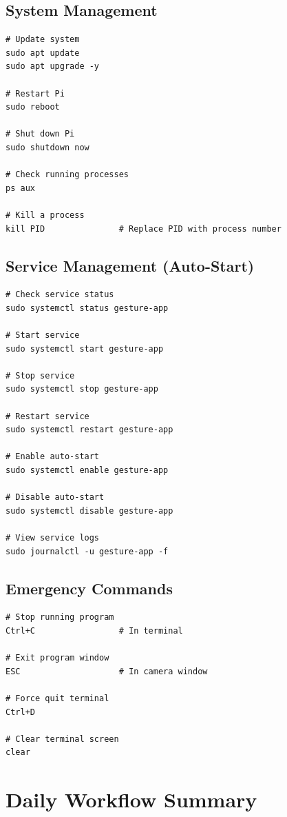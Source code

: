 \documentclass[12pt,a4paper]{article}
\begin{document}
\subsection{System Management}

\begin{lstlisting}
# Update system
sudo apt update
sudo apt upgrade -y

# Restart Pi
sudo reboot

# Shut down Pi
sudo shutdown now

# Check running processes
ps aux

# Kill a process
kill PID               # Replace PID with process number
\end{lstlisting}

\subsection{Service Management (Auto-Start)}

\begin{lstlisting}
# Check service status
sudo systemctl status gesture-app

# Start service
sudo systemctl start gesture-app

# Stop service
sudo systemctl stop gesture-app

# Restart service
sudo systemctl restart gesture-app

# Enable auto-start
sudo systemctl enable gesture-app

# Disable auto-start
sudo systemctl disable gesture-app

# View service logs
sudo journalctl -u gesture-app -f
\end{lstlisting}

\subsection{Emergency Commands}

\begin{lstlisting}
# Stop running program
Ctrl+C                 # In terminal

# Exit program window
ESC                    # In camera window

# Force quit terminal
Ctrl+D

# Clear terminal screen
clear
\end{lstlisting}

\section{Daily Workflow Summary}
\end{document}
